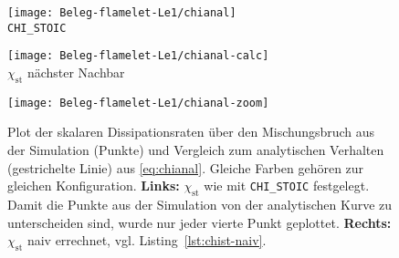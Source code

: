 \begin{figure}[H]\begin{center}
    \begin{minipage}{0.33\linewidth}\begin{center}
        \texttt{[image: Beleg-flamelet-Le1/chianal]}
        \\\lstinline!CHI_STOIC!
    \end{center}\end{minipage}\begin{minipage}{0.33\linewidth}\begin{center}
        \texttt{[image: Beleg-flamelet-Le1/chianal-calc]}
        \\$\chi_\mathrm{st}$ nächster Nachbar
    \end{center}\end{minipage}\begin{minipage}{0.33\linewidth}\begin{center}
        \texttt{[image: Beleg-flamelet-Le1/chianal-zoom]}
    \end{center}\end{minipage}
    \caption{Plot der skalaren Dissipationsraten über den Mischungsbruch aus der Simulation (Punkte) und Vergleich zum analytischen Verhalten (gestrichelte Linie) aus \autoref{eq:chianal}. Gleiche Farben gehören zur gleichen Konfiguration. \textbf{Links:} $\chi_\mathrm{st}$ wie mit \lstinline!CHI_STOIC! festgelegt. Damit die Punkte aus der Simulation von der analytischen Kurve zu unterscheiden sind, wurde nur jeder vierte Punkt geplottet. \textbf{Rechts:} $\chi_\mathrm{st}$ naiv errechnet, vgl. Listing~\ref{lst:chist-naiv}.}
    \label{fig:flameletLe1:chianal}
\end{center}\end{figure}

